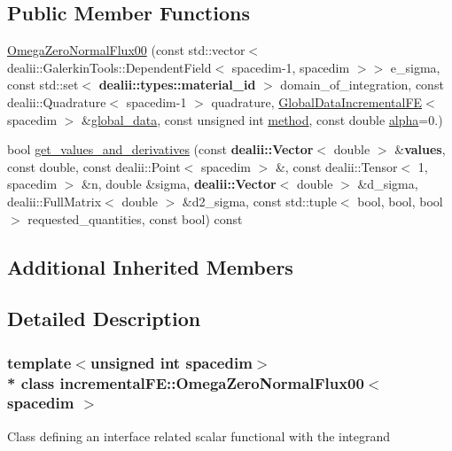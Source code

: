 \subsection*{Public Member Functions}
\begin{DoxyCompactItemize}
\item 
\hyperlink{classincremental_f_e_1_1_omega_zero_normal_flux00_ae6b3992a1f7b54c41935c44115caafec}{Omega\+Zero\+Normal\+Flux00} (const std\+::vector$<$ dealii\+::\+Galerkin\+Tools\+::\+Dependent\+Field$<$ spacedim-\/1, spacedim $>$$>$ e\+\_\+sigma, const std\+::set$<$ {\bf dealii\+::types\+::material\+\_\+id} $>$ domain\+\_\+of\+\_\+integration, const dealii\+::\+Quadrature$<$ spacedim-\/1 $>$ quadrature, \hyperlink{classincremental_f_e_1_1_global_data_incremental_f_e}{Global\+Data\+Incremental\+FE}$<$ spacedim $>$ \&\hyperlink{classincremental_f_e_1_1_omega_abd23d288a7a4a43f9b528be968cd2113}{global\+\_\+data}, const unsigned int \hyperlink{classincremental_f_e_1_1_omega_a7600d263ebf98129629e44fa67e8a58c}{method}, const double \hyperlink{classincremental_f_e_1_1_omega_a891688560ec0ad8dc5a0058a7b400269}{alpha}=0.)
\item 
bool \hyperlink{classincremental_f_e_1_1_omega_zero_normal_flux00_a5e3158d47ccf7f0bf53dda6a93d27c57}{get\+\_\+values\+\_\+and\+\_\+derivatives} (const {\bf dealii\+::\+Vector}$<$ double $>$ \&{\bf values}, const double, const dealii\+::\+Point$<$ spacedim $>$ \&, const dealii\+::\+Tensor$<$ 1, spacedim $>$ \&n, double \&sigma, {\bf dealii\+::\+Vector}$<$ double $>$ \&d\+\_\+sigma, dealii\+::\+Full\+Matrix$<$ double $>$ \&d2\+\_\+sigma, const std\+::tuple$<$ bool, bool, bool $>$ requested\+\_\+quantities, const bool) const 
\end{DoxyCompactItemize}
\subsection*{Additional Inherited Members}


\subsection{Detailed Description}
\subsubsection*{template$<$unsigned int spacedim$>$\\*
class incremental\+F\+E\+::\+Omega\+Zero\+Normal\+Flux00$<$ spacedim $>$}

Class defining an interface related scalar functional with the integrand

